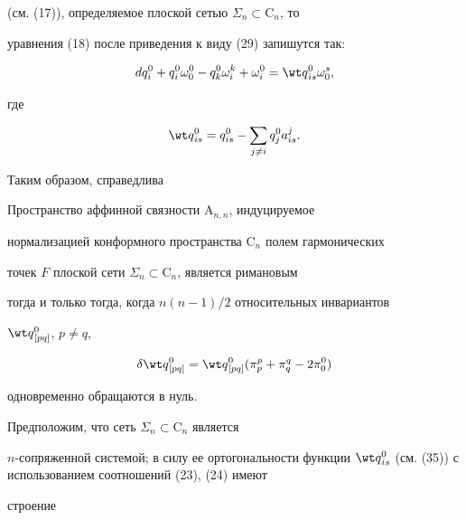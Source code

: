 (см. (17)), определяемое плоской сетью $\Sigma_n\subset\mathrm C_n$, то 


уравнения (18) после приведения к виду (29) запишутся так: 


$$ 


dq^0_i+q^0_i\omega^0_0-q^0_k\omega^k_i+ 


\omega^0_i=\wt q{}^0_{is}\omega^s_0, 


$$ 


где 


\begin{equation} 


\wt q{}^0_{is}=q^0_{is}-\sum_{j\ne i}q^0_j a^j_{is}. 


\end{equation} 


 


Таким образом, справедлива 


 


\begin{thm} 


Пространство аффинной связности $\mathrm A_{n,n}$, индуцируемое 


нормализацией конформного пространства $\mathrm C_n$ полем гармонических 


точек $F$ плоской сети $\Sigma_n\subset\mathrm C_n$, является римановым 


тогда и только тогда, когда ${n(n-1)}/{2}$ относительных инвариантов 


$\wt q{}^0_{[pq]}$, $p\ne q$, 


$$ 


\delta\wt q{}^0_{[pq]}=\wt q{}^0_{[pq]}(\pi^p_p+ 


\pi^q_q-2\pi^0_0) 


$$ 


одновременно обращаются в нуль. 


\end{thm} 


 


 


Предположим, что сеть $\Sigma_n\subset\mathrm C_n$ является 


$n$-сопряженной системой; в силу ее ортогональности функции $\wt 


q{}^0_{is}$ (см. (35)) с использованием соотношений (23), (24) имеют 


строение 


$$ 


